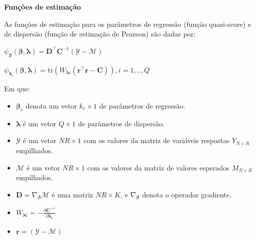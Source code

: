 \documentclass[handout,serif, professionalfont, usenames, dvipsnames, aspectratio = 169]{beamer}\usepackage[]{graphicx}\usepackage[]{color}
\begin{document}
\begin{frame}[c, allowframebreaks]

\textbf{Funções de estimação}

As funções de estimação para os parâmetros de regressão (função quasi-score) e de dispersão (função de estimação de Pearson) são dadas por:

\begin{center}
$\psi_{\boldsymbol{\beta}}(\boldsymbol{\beta}, \boldsymbol{\lambda}) = \boldsymbol{D}^\top \boldsymbol{C}^{-1}(\mathcal{Y} - \mathcal{M})$

$\psi_{\boldsymbol{\lambda}_i}(\boldsymbol{\beta}, \boldsymbol{\lambda}) = \mathrm{tr}(W_{\boldsymbol{\lambda}i} (\boldsymbol{r}^\top\boldsymbol{r} - \boldsymbol{C})),  i = 1,.., Q$
\end{center}

Em que:

\begin{itemize}
  
  \item $\boldsymbol{\beta}_r$ denota um vetor $k_r \times 1$ de parâmetros de regressão.
  
  \item $\boldsymbol{\lambda}$ é um vetor $Q \times 1$ de parâmetros de dispersão.
  
  \item $\mathcal{Y}$ é um vetor $NR \times 1$ com os valores da matriz de variáveis respostas $Y_{N \times R}$ empilhados.
  
  \item $\mathcal{M}$ é um vetor $NR \times 1$ com os valores da matriz de valores esperados $M_{N \times R}$ empilhados.
  
  \item $\boldsymbol{D} = \nabla_{\boldsymbol{\beta}} \mathcal{M}$ 
é uma matriz $NR \times K$, e $\nabla_{\boldsymbol{\beta}}$ denota o 
operador gradiente.
  
  \item $W_{\boldsymbol{\lambda}i} = -\frac{\partial
    \boldsymbol{C}^{-1}}{\partial \boldsymbol{\lambda}_i}$ 
    
  \item $\boldsymbol{r} = (\mathcal{Y} - \mathcal{M})$
  
\end{itemize}

\end{frame}

\end{document}
